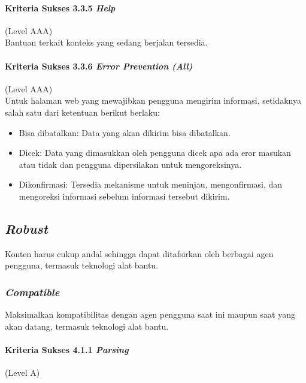 \paragraph{Kriteria Sukses 3.3.5 \textit{Help}}
\label{sec:kriteria_sukses_3.3.5}
(Level AAA)\\

Bantuan terkait konteks yang sedang berjalan tersedia.

\paragraph{Kriteria Sukses 3.3.6 \textit{Error Prevention (All)}}
\label{sec:kriteria_sukses_3.3.6}
(Level AAA)\\

Untuk halaman web yang mewajibkan pengguna mengirim informasi, setidaknya salah satu dari ketentuan berikut berlaku:
\begin{itemize}
	\item Bisa dibatalkan: Data yang akan dikirim bisa dibatalkan.
	\item Dicek: Data yang dimasukkan oleh pengguna dicek apa ada eror masukan atau tidak dan pengguna dipersilakan untuk mengoreksinya.
	\item Dikonfirmasi: Tersedia mekanisme untuk meninjau, mengonfirmasi, dan mengoreksi informasi sebelum informasi tersebut dikirim.
\end{itemize}


\subsection{\textit{Robust}}
\label{sec:robust}
Konten harus cukup andal sehingga dapat ditafsirkan oleh berbagai agen pengguna, termasuk teknologi alat bantu.

\subsubsection{\textit{Compatible}}
\label{sec:compatible}
Maksimalkan kompatibilitas dengan agen pengguna saat ini maupun saat yang akan datang, termasuk teknologi alat bantu.

\paragraph{Kriteria Sukses 4.1.1 \textit{Parsing}}
\label{sec:kriteria_sukses_4.1.1}
(Level A)\\

